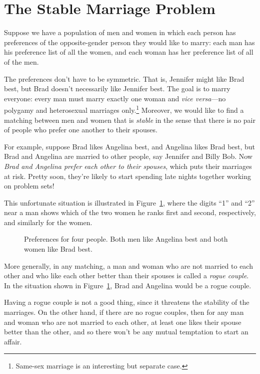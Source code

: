 \section{The Stable Marriage Problem}
\label{stablemarriagesec}
Suppose we have a population of men and women in which each person has
preferences of the opposite-gender person they would like to marry:
each man has his preference list of all the women, and each woman has
her preference list of all of the men.

The preferences don't have to be symmetric.  That is, Jennifer might
like Brad best, but Brad doesn't necessarily like Jennifer best.  The
goal is to marry everyone: every man must marry exactly one woman and
\emph{vice versa}---no polygamy and heterosexual marriages
only.\footnote{Same-sex marriage is an interesting but separate case.}
Moreover, we would like to find a
matching between men and women that is \emph{stable} in the sense that
there is no pair of people who prefer one another to their spouses.

For example, suppose Brad likes Angelina best, and Angelina likes Brad
best, but Brad and Angelina are married to other people, say Jennifer
and Billy Bob.  Now \emph{Brad and Angelina prefer each other to their
  spouses}, which puts their marriages at risk.  Pretty soon, they're
likely to start spending late nights together working on problem sets!

This unfortunate situation is illustrated in
Figure~\ref{fig:minWtMatch2}, where the digits ``1'' and ``2'' near a
man shows which of the two women he ranks first and second,
respectively, and similarly for the women.

\begin{figure}


\caption{Preferences for four people.  Both men like Angelina best and
both women like Brad best.}
\label{fig:minWtMatch2}
\end{figure}

More generally, in any matching, a man and woman who are not married
to each other and who like each other better than their spouses is
called a \emph{rogue couple}.  In the situation shown in
Figure~\ref{fig:minWtMatch2}, Brad and Angelina would be a rogue
couple.

Having a rogue couple is not a good thing, since it threatens the
stability of the marriages.  On the other hand, if there are no rogue
couples, then for any man and woman who are not married to each other,
at least one likes their spouse better than the other, and so there
won't be any mutual temptation to start an affair.

